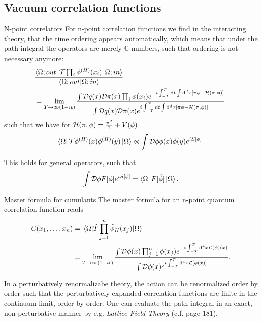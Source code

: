 \subsection{Vacuum correlation functions}
\begin{mybox}{N-point correlators}
	For n-point correlation functions we find in the interacting theory, that the time ordering appears automatically, which means that under the path-integral the operators are merely $\mathbb{C}$-numbers, such that ordering is not necessary anymore:
	\begin{align}
	&\frac{\bra{\Omega;out} \mathcal{T}\prod_i \phi^{(H)}(x_i) \ket{\Omega;in}}{\braket{\Omega;out}{\Omega;in}} \\
	&= \lim_{T\rightarrow \infty(1-i \epsilon)} 
	\frac{\int \mathcal{D}q(x) \mathcal{D}\pi(x)\prod_i \phi(x_i) e^{-i \int_{-T}^{T} \mathrm{d} t \int \mathrm{d}^dx[\pi \dot{\phi}-\mathcal{H}(\pi,\phi)]} }{\int \mathcal{D}q(x) \mathcal{D}\pi(x) e^{i \int_{-T}^T \mathrm{d} t \int \mathrm{d}^dx[\pi \dot{\phi}-\mathcal{H}(\pi,\phi)] }}\nonumber.
	\end{align}
such that we have for $\mathcal{H}(\pi,\phi)=\frac{\pi^2}{2}+V(\phi)$
\begin{equation}
	\bra{ \Omega}\mathcal{T}\phi^{(H)}(x) \phi^{(H)}(y) \ket{\Omega}\propto \int \mathcal{D}\phi \phi(x) \phi(y) e^{i S[\phi]}.
\end{equation}
\end{mybox}
This holds for general operators, such that
\begin{equation}
	\int \mathcal{D}\phi F[\phi] e^{iS[\phi]} = \bra{ \Omega}F[\hat{ \phi}]\ket{\Omega}.
\end{equation}
\begin{mybox}{Master formula for cumulants}
	The master formula for an n-point quantum correlation function reads
	\begin{align}
		G(x_1,\dots,x_n) &= \expval{\hat{T} \prod_{j=1}^{n} \hat{\phi}_H(x_j) }{\Omega} \nonumber\\
		&= \lim_{T\rightarrow\infty(1-i\epsilon)} \frac{\int \mathcal{D}\phi(x) \prod_{j=1}^{n} \phi(x_j) e^{-i \int_{-T}^T \mathrm{d}^4 x \mathcal{L}(\phi)(x) } }{\int \mathcal{D}\phi(x) e^{i \int_{-T}^T \mathrm{d}^4 x \mathcal{L} [\phi(x)]}}.
	\end{align}
\end{mybox}
In a perturbatively renormalizabe theory, the action can be renormalized order by order such that the perturbatively expanded correlation functions are finite in the continuum limit, order by order. One can evaluate the path-integral in an exact, non-perturbative manner by e.g. \emph{Lattice Field Theory} (c.f. page 181).

